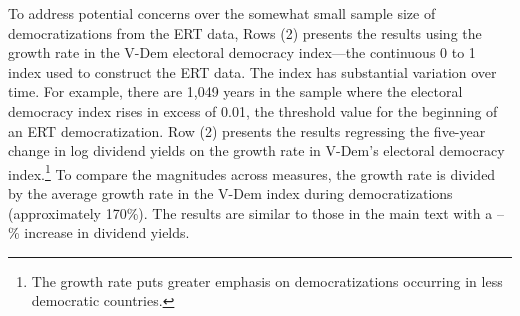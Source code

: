 \documentclass[12pt]{article}
\numberwithin{equation}{section}
\begin{document}
To address potential concerns over the somewhat small sample size of democratizations from the ERT data, Rows (2) presents the results using the growth rate in the V-Dem electoral democracy index---the continuous 0 to 1 index used to construct the ERT data. The index has substantial variation over time. For example, there are 1,049 years in the sample where the electoral democracy index rises in excess of 0.01, the threshold value for the beginning of an ERT democratization.  Row (2) presents the results regressing the five-year change in log dividend yields on the growth rate in V-Dem's electoral democracy index.\footnote{The growth rate puts greater emphasis on democratizations occurring in less democratic countries.} To compare the magnitudes across measures, the growth rate is divided by the average growth rate in the V-Dem index during democratizations (approximately 170\%).  The results are similar to those in the main text with a \tabBThreeIndexGrowthLow\---\tabBThreeIndexGrowthHigh\% increase in dividend yields.  
\end{document}
